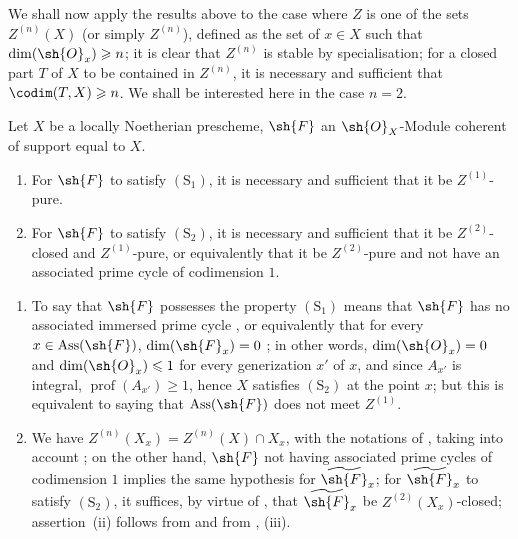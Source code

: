 \begin{env}[5.10.13]
\label{IV.5.10.13}
We shall now apply the results above to the case where $Z$ is one of the sets $Z^{(n)}(X)$ (or simply $Z^{(n)}$), defined as the set of $x\in X$ such that $\dim(\sh{O}_x)\geqslant n$; it is clear that $Z^{(n)}$ is stable by specialisation; for a closed part $T$ of $X$ to be contained in $Z^{(n)}$, it is necessary and sufficient that $\codim(T,X)\geqslant n$.
We shall be interested here in the case $n=2$.
\end{env}

\begin{proposition}[5.10.14]
\label{IV.5.10.14}
Let $X$ be a locally Noetherian prescheme, $\sh{F}$ an $\sh{O}_X$-Module coherent of support equal to $X$.
\begin{enumerate}[label=\emph{\roman*)}]
  \item For $\sh{F}$ to satisfy $(\mathrm{S}_1)$, it is necessary and sufficient that it be $Z^{(1)}$-pure.
  \item For $\sh{F}$ to satisfy $(\mathrm{S}_2)$, it is necessary and sufficient that it be $Z^{(2)}$-closed and $Z^{(1)}$-pure, or equivalently that it be $Z^{(2)}$-pure and not have an associated prime cycle of codimension $1$.
\end{enumerate}
\begin{enumerate}
  \item[\rm(i)] To say that $\sh{F}$ possesses the property $(\mathrm{S}_1)$ means that $\sh{F}$ has no associated immersed prime cycle , or equivalently that for every $x\in\operatorname{Ass}(\sh{F})$, $\dim(\sh{F}_x)=0$ ; in other words, $\dim(\sh{O}_x)=0$ and $\dim(\sh{O}_x)\leqslant 1$ for every generization $x'$ of $x$, and since $A_{x'}$ is integral, $\operatorname{prof}(A_{x'})\geqslant 1$, hence $X$ satisfies $(\mathrm{S}_2)$ at the point $x$; but this is equivalent to saying that $\operatorname{Ass}(\sh{F})$ does not meet $Z^{(1)}$.
  \item[\rm(ii)] We have $Z^{(n)}(X_x)=Z^{(n)}(X)\cap X_x$, with the notations of , taking into account ; on the other hand, $\sh{F}$ not having associated prime cycles of codimension $1$ implies the same hypothesis for $\widetilde{\sh{F}}_x$; for $\widetilde{\sh{F}}_x$ to satisfy $(\mathrm{S}_2)$, it suffices, by virtue of , that $\widetilde{\sh{F}}_x$ be $Z^{(2)}(X_x)$-closed; assertion~(ii) follows from  and from , (iii).
\end{enumerate}
\end{proposition}

